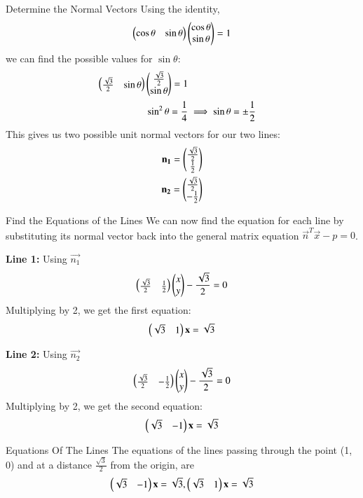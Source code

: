 \documentclass{beamer}
\begin{document}
\begin{frame}{Determine the Normal Vectors}
    Using the identity,
\begin{align}
    \begin{pmatrix}\cos\theta & \sin\theta\end{pmatrix}\begin{pmatrix}\cos\theta \\ \sin\theta\end{pmatrix}=1
\end{align}
 we can find the possible values for $\sin\theta$:
\begin{align}
\begin{pmatrix}\frac{\sqrt{3}}{2} & \sin\theta\end{pmatrix}\begin{pmatrix}\frac{\sqrt{3}}{2} \\ \sin\theta\end{pmatrix}=1\\
\sin^2\theta = \frac{1}{4} &\implies \sin\theta = \pm \frac{1}{2}
\end{align}
This gives us two possible unit normal vectors for our two lines:
\begin{align}
\mathbf{n_1} = \begin{pmatrix}\frac{\sqrt{3}}{2} \\ \frac{1}{2}\end{pmatrix}\\
\mathbf{n_2} = \begin{pmatrix}\frac{\sqrt{3}}{2} \\ -\frac{1}{2}\end{pmatrix}
\end{align}
\end{frame}
\begin{frame}{Find the Equations of the Lines}
    We can now find the equation for each line by substituting its normal vector back into the general matrix equation $\vec{n}^T \vec{x} - p = 0$.

\textbf{Line 1:} Using $\vec{n_1}$
\begin{align}
\begin{pmatrix} \frac{\sqrt{3}}{2} & \frac{1}{2}\end{pmatrix} \begin{pmatrix}x \\ y\end{pmatrix} - \frac{\sqrt{3}}{2} = 0 
\end{align}
Multiplying by 2, we get the first equation:
\begin{align}
 \begin{pmatrix}\sqrt{3}&1\end{pmatrix}\mathbf{x}=\sqrt{3} 
 \end{align}

\textbf{Line 2:} Using $\vec{n_2}$
\begin{align}
\begin{pmatrix}\frac{\sqrt{3}}{2} & -\frac{1}{2}\end{pmatrix} \begin{pmatrix}x \\ y\end{pmatrix} - \frac{\sqrt{3}}{2} = 0
\end{align}
Multiplying by 2, we get the second equation:
\begin{align}   
 \begin{pmatrix}\sqrt{3}&-1\end{pmatrix}\mathbf{x}=\sqrt{3} 
\end{align}
\end{frame}
\begin{frame}{Equations Of The Lines}
The equations of the lines passing through the point (1, 0) and at a distance $\frac{\sqrt{3}}{2}$ from the origin, are 
\begin{align}
     \begin{pmatrix}\sqrt{3}&-1\end{pmatrix}\mathbf{x}=\sqrt{3} ,\begin{pmatrix}\sqrt{3}&1\end{pmatrix}\mathbf{x}=\sqrt{3}
\end{align}    
\end{frame}
\end{document}
